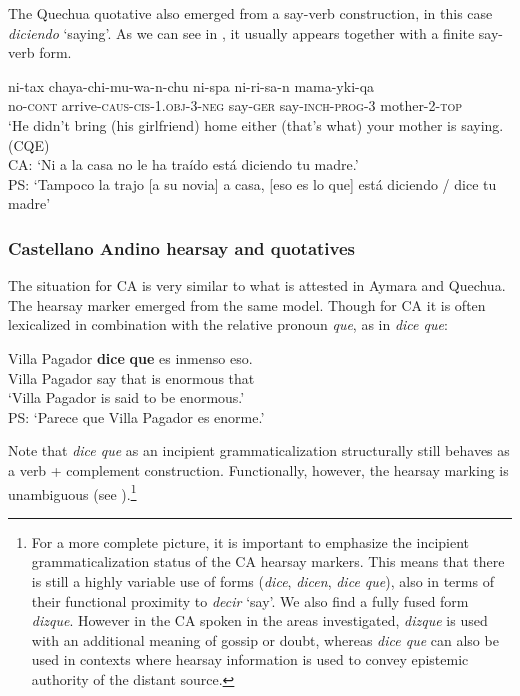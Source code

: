 \documentclass[output=paper,hidelinks]{langscibook}
\begin{document}
\z

The Quechua quotative also emerged from a say-verb construction, in this case \textit{diciendo} `saying'. As we can see in , it usually appears together with a finite say-verb form.


\ea \label{ex:Qquotative}
\gll ni-tax chaya-chi-mu-wa-n-chu ni-spa ni-ri-sa-n mama-yki-qa \\
no-\textsc{cont} arrive-\textsc{caus-cis-1.obj-3-neg} say-\textsc{ger} say-\textsc{inch-prog-3} mother-\textsc{2-top} \\ 
\glt ‘He didn't bring (his girlfriend) home either (that's what) your mother is saying. (CQE)\\
CA: `Ni a la casa no le ha traído está diciendo tu madre.'\\
PS: `Tampoco la trajo [a su novia] a casa, [eso es lo que] está diciendo / dice tu madre'\\
\z



\subsubsection{Castellano Andino hearsay and quotatives}

The situation for CA is very similar to what is attested in Aymara and Quechua. The hearsay marker emerged from the same model. Though for CA it is often lexicalized in combination with the relative pronoun \textit{que}, as in \textit{dice que}: 

\largerpage
\ea \label{ex:CA-diceque}
\gll Villa Pagador \textbf{dice} \textbf{que} es inmenso eso. \\
Villa Pagador say that is enormous that \\ \glt ‘Villa Pagador is said to be enormous.’\\
PS: `Parece que Villa Pagador es enorme.'
\z

Note that \textit{dice que} as an incipient grammaticalization structurally still behaves as a verb + complement construction. Functionally, however, the hearsay marking is unambiguous (see \citealt{dankel2015strategien}).\footnote{For a more complete picture, it is important to emphasize the incipient grammaticalization status of the CA hearsay markers. This means that there is still a highly variable use of forms (\textit{dice}, \textit{dicen}, \textit{dice que}), also in terms of their functional proximity to \textit{decir} `say'. We also find a fully fused form \textit{dizque}. However in the CA spoken in the areas investigated, \textit{dizque} is used with an additional meaning of gossip or doubt, whereas \textit{dice que} can also be used in contexts where hearsay information is used to convey epistemic authority of the distant source.}
\end{document}
